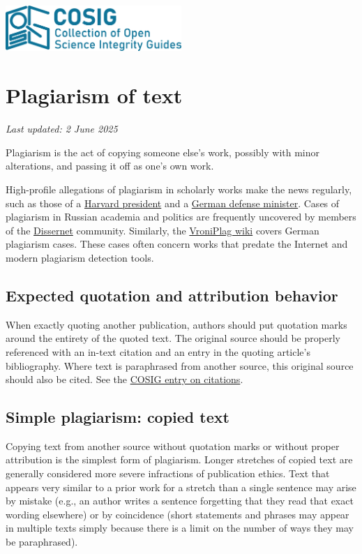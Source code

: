 \documentclass[letterpaper, 12pt]{article}
\begin{document}
\flushleft
\includegraphics[width=0.5\textwidth]{img/home/241017_final_logo_mockup.png}

\section*{Plagiarism of text}
\textit{Last updated: 2 June 2025}

Plagiarism is the act of copying someone else's work, possibly with minor alterations, and passing it off as one's own work.

High-profile allegations of plagiarism in scholarly works make the news regularly, such as those of a \href{https://www.theguardian.com/education/2024/jan/06/harvard-claudine-gay-plagiarism}{Harvard president} and a \href{https://www.bbc.com/news/world-europe-12504347}{German defense minister}. Cases of plagiarism in Russian academia and politics are frequently uncovered by members of the \href{https://dissernet.org/}{Dissernet} community. Similarly, the \href{https://vroniplag.fandom.com/de/wiki/Home}{VroniPlag wiki} covers German plagiarism cases. These cases often concern works that predate the Internet and modern plagiarism detection tools.

\subsection*{Expected quotation and attribution behavior}

When exactly quoting another publication, authors should put quotation marks around the entirety of the quoted text. The original source should be properly referenced with an in-text citation and an entry in the quoting article's bibliography. Where text is paraphrased from another source, this original source should also be cited. See the \href{https://osf.io/zpf4r}{COSIG entry on citations}.

\subsection*{Simple plagiarism: copied text}

Copying text from another source without quotation marks or without proper attribution is the simplest form of plagiarism. Longer stretches of copied text are generally considered more severe infractions of publication ethics. Text that appears very similar to a prior work for a stretch than a single sentence may arise by mistake (e.g., an author writes a sentence forgetting that they read that exact wording elsewhere) or by coincidence (short statements and phrases may appear in multiple texts simply because there is a limit on the number of ways they may be paraphrased).
\end{document}
